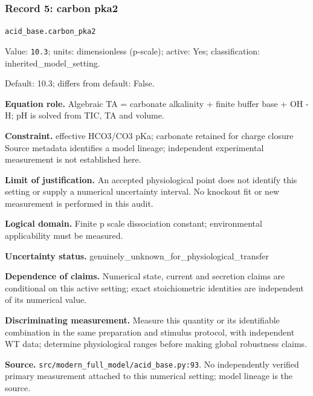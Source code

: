 \subsubsection*{Record 5: carbon pka2}
{\small \nolinkurl{acid_base.carbon_pka2}\par

Value: \texttt{10.3}; units: dimensionless (p-scale); active: Yes; classification: inherited\_model\_setting.\par

Default: 10.3; differs from default: False.\par

\textbf{Equation role.} Algebraic TA = carbonate alkalinity + finite buffer base + OH - H; pH is solved from TIC, TA and volume.\par

\textbf{Constraint.} effective HCO3/CO3 pKa; carbonate retained for charge closure Source metadata identifies a model lineage; independent experimental measurement is not established here.\par

\textbf{Limit of justification.} An accepted physiological point does not identify this setting or supply a numerical uncertainty interval. No knockout fit or new measurement is performed in this audit.\par

\textbf{Logical domain.} Finite p scale dissociation constant; environmental applicability must be measured.\par

\textbf{Uncertainty status.} genuinely\_unknown\_for\_physiological\_transfer\par

\textbf{Dependence of claims.} Numerical state, current and secretion claims are conditional on this active setting; exact stoichiometric identities are independent of its numerical value.\par

\textbf{Discriminating measurement.} Measure this quantity or its identifiable combination in the same preparation and stimulus protocol, with independent WT data; determine physiological ranges before making global robustness claims.\par

\textbf{Source.} \nolinkurl{src/modern_full_model/acid_base.py:93}. No independently verified primary measurement attached to this numerical setting; model lineage is the source.\par}

